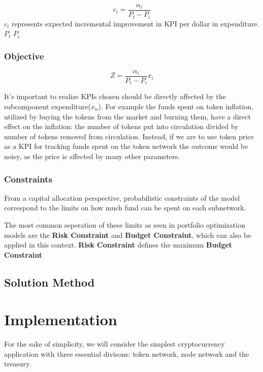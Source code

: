 \documentclass[conference,letterpaper]{IEEEtran}
\begin{document}
                \[c_i = \frac{\alpha_i}{P_t - P_i}\] $c_i$ represents expected incremental
                improvement in KPI per dollar in expenditure. $P_t$ $P_c$
                

            \subsubsection{Objective}
                
                \[Z = \frac{\alpha_i}{P_t - P_i} x_i\] 

                It's important to realize KPIs chosen should be directly affected by the
                subcomponent expenditure($x_n$). For example the funds spent on token
                inflation, utilized by buying the tokens from the market and burning them,
                have a direct effect on the inflation: the number of tokens put into
                circulation divided by number of tokens removed from circulation. Instead,
                if we are to use token price as a KPI for tracking funds spent on the
                token network the outcome would be noisy, as the price is affected by many
                other parameters.
                \newline

            \subsubsection{Constraints}

            From a capital allocation perspective, probabilistic constraints of the model
            correspond to the limits on how much fund can be spent on each subnetwork.


            The most common seperation of these limits as seen in portfolio optimization
            models are the \textbf{Risk Constraint} and \textbf{Budget Constraint}, which
            can also be applied in this context. \textbf{Risk Constraint} defines the
            maximum 
            \textbf{Budget Constraint}

            \subsection{Solution Method}

    \section{Implementation}
        For the sake of simplicity, we will consider the simplest cryptocurrency
        application with three essential divisons: token network, node network and the
        treasury. 
\end{document}
